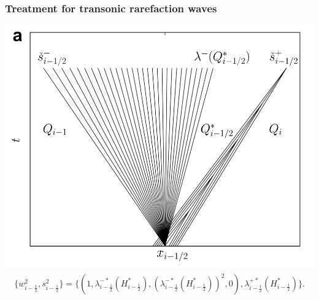 \documentclass{beamer}
\begin{document}
\frame
{
\frametitle{Treatment for transonic rarefaction waves}
\includegraphics[width=0.83\linewidth]{transonic.png}
\begin{align*}
\lbrace w_{i-\frac{1}{2}}^2,s_{i-\frac{1}{2}}^2 \rbrace=\lbrace
(1,\lambda_{i-\frac{1}{2}}^{-*}(H_{i-\frac{1}{2}}^*),(\lambda_{i-\frac{1}{2}}^{-*}(H_{i-\frac{1}{2}}^*))^2,0), \lambda_{i-\frac{1}{2}}^{+*}(H_{i-\frac{1}{2}}^*)
\rbrace.
\end{align*}
}
\end{document}
